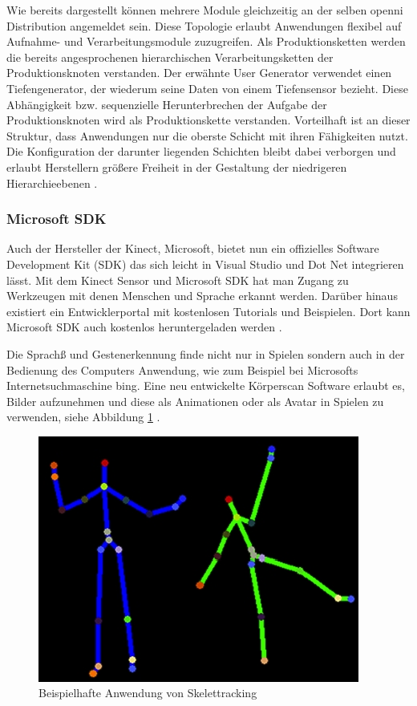 Wie bereits dargestellt können mehrere Module gleichzeitig an der selben \gls{openni} Distribution angemeldet sein.
 Diese Topologie erlaubt Anwendungen flexibel auf Aufnahme- und Verarbeitungsmodule zuzugreifen.
 Als Produktionsketten werden die bereits angesprochenen hierarchischen Verarbeitungsketten der Produktionsknoten verstanden.
 Der erwähnte User Generator verwendet einen Tiefengenerator, der wiederum seine Daten von einem Tiefensensor bezieht.
 Diese Abhängigkeit bzw. sequenzielle Herunterbrechen der Aufgabe der Produktionsknoten wird als Produktionskette verstanden.
 Vorteilhaft ist an dieser Struktur, dass Anwendungen nur die oberste Schicht mit ihren Fähigkeiten nutzt.
 Die Konfiguration der darunter liegenden Schichten bleibt dabei verborgen und erlaubt Herstellern größere Freiheit
 in der Gestaltung der niedrigeren Hierarchieebenen \citep{openNI2012}.

\subsubsection{Microsoft SDK}

Auch der Hersteller der Kinect, Microsoft, bietet nun ein offizielles Software Development Kit (SDK)
 das sich leicht in Visual Studio und Dot Net integrieren lässt. Mit dem Kinect Sensor und Microsoft SDK
 hat man Zugang zu Werkzeugen mit denen Menschen und Sprache erkannt werden.
 Darüber hinaus existiert ein Entwicklerportal mit kostenlosen Tutorials und Beispielen.
 Dort kann Microsoft SDK auch kostenlos heruntergeladen werden \citep{kinectDevKfW2012}.

Die Sprachß und Gestenerkennung finde nicht nur in Spielen sondern auch in der Bedienung des Computers Anwendung,
 wie zum Beispiel bei Microsofts Internetsuchmaschine bing. Eine neu entwickelte Körperscan Software erlaubt es,
 Bilder aufzunehmen und diese als Animationen oder als Avatar in Spielen zu
 verwenden, siehe Abbildung \ref{fig:skelettracking} \citep{noGameKinect2012}.

\begin{figure}[h]
\center
\includegraphics[scale=0.8]{graphics/skelettracking.jpg}
\caption{\label{fig:skelettracking} Beispielhafte Anwendung von Skelettracking
\citep{noGameKinect2012}}
\end{figure}
